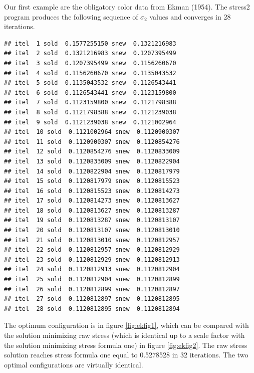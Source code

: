\documentclass[
  12pt,
]{article}
\theoremstyle{definition}
\theoremstyle{definition}
\theoremstyle{definition}
\theoremstyle{definition}
\theoremstyle{remark}
\begin{document}
Our first example are the obligatory color data from Ekman (1954). The stress2
program produces the following sequence of \(\sigma_2\) values and
converges in 28 iterations.

\begin{verbatim}
## itel  1 sold  0.1577255150 snew  0.1321216983 
## itel  2 sold  0.1321216983 snew  0.1207395499 
## itel  3 sold  0.1207395499 snew  0.1156260670 
## itel  4 sold  0.1156260670 snew  0.1135043532 
## itel  5 sold  0.1135043532 snew  0.1126543441 
## itel  6 sold  0.1126543441 snew  0.1123159800 
## itel  7 sold  0.1123159800 snew  0.1121798388 
## itel  8 sold  0.1121798388 snew  0.1121239038 
## itel  9 sold  0.1121239038 snew  0.1121002964 
## itel  10 sold  0.1121002964 snew  0.1120900307 
## itel  11 sold  0.1120900307 snew  0.1120854276 
## itel  12 sold  0.1120854276 snew  0.1120833009 
## itel  13 sold  0.1120833009 snew  0.1120822904 
## itel  14 sold  0.1120822904 snew  0.1120817979 
## itel  15 sold  0.1120817979 snew  0.1120815523 
## itel  16 sold  0.1120815523 snew  0.1120814273 
## itel  17 sold  0.1120814273 snew  0.1120813627 
## itel  18 sold  0.1120813627 snew  0.1120813287 
## itel  19 sold  0.1120813287 snew  0.1120813107 
## itel  20 sold  0.1120813107 snew  0.1120813010 
## itel  21 sold  0.1120813010 snew  0.1120812957 
## itel  22 sold  0.1120812957 snew  0.1120812929 
## itel  23 sold  0.1120812929 snew  0.1120812913 
## itel  24 sold  0.1120812913 snew  0.1120812904 
## itel  25 sold  0.1120812904 snew  0.1120812899 
## itel  26 sold  0.1120812899 snew  0.1120812897 
## itel  27 sold  0.1120812897 snew  0.1120812895 
## itel  28 sold  0.1120812895 snew  0.1120812894
\end{verbatim}

The optimum configuration is in figure \ref{fig:ekfig1}, which can be compared with the
solution minimizing raw stress (which is identical up to a scale factor with the solution
minimizing stress formula one) in figure \ref{fig:ekfig2}. The raw stress solution
reaches stress formula one equal to 0.5278528 in 32 iterations. The two optimal
configurations are virtually identical.
\end{document}
